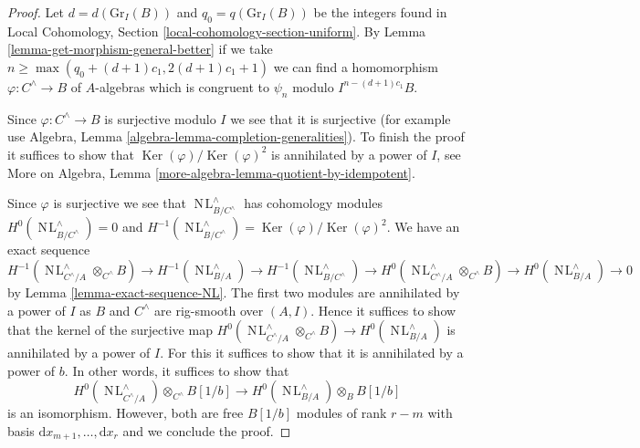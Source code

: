 \documentclass[10pt,a4paper]{amsart}
\theoremstyle{plain}
\theoremstyle{definition}
\theoremstyle{remark}
\numberwithin{equation}{subsection}
\def\NL{\mathop{N\!L}\nolimits}
\def\Ker{\mathop{\mathrm{Ker}}}
\begin{document}
\begin{proof}
\medskip\noindent
Let $d = d(\text{Gr}_I(B))$ and $q_0 = q(\text{Gr}_I(B))$ be the integers
found in 
Local Cohomology, Section \ref{local-cohomology-section-uniform}.
By Lemma \ref{lemma-get-morphism-general-better} if we take
$n \geq \max(q_0 + (d + 1)c_1, 2(d + 1)c_1 + 1)$ we can find a homomorphism
$\varphi : C^\wedge \to B$ of $A$-algebras which is congruent to
$\psi_n$ modulo $I^{n - (d + 1)c_1}B$.

\medskip\noindent
Since $\varphi : C^\wedge \to B$ is surjective modulo $I$
we see that it is surjective (for example use
Algebra, Lemma \ref{algebra-lemma-completion-generalities}).
To finish the proof it suffices to show that
$\Ker(\varphi)/\Ker(\varphi)^2$ is annihilated by a power of $I$, see
More on Algebra, Lemma \ref{more-algebra-lemma-quotient-by-idempotent}.

\medskip\noindent
Since $\varphi$ is surjective we see that
$\NL_{B/C^{\wedge}}^\wedge$ has cohomology modules
$H^0(\NL_{B/C^{\wedge}}^\wedge) = 0$ and
$H^{-1}(\NL_{B/C^{\wedge}}^\wedge) = \Ker(\varphi)/\Ker(\varphi)^2$.
We have an exact sequence
$$
H^{-1}(\NL_{C^\wedge/A}^\wedge \otimes_{C^\wedge} B) \to
H^{-1}(\NL_{B/A}^\wedge) \to
H^{-1}(\NL_{B/C^{\wedge}}^\wedge) \to
H^0(\NL_{C^\wedge/A}^\wedge \otimes_{C^\wedge} B) \to
H^0(\NL_{B/A}^\wedge) \to 0
$$
by Lemma \ref{lemma-exact-sequence-NL}. The first two modules are
annihilated by a power of $I$ as $B$ and $C^\wedge$ are rig-smooth over
$(A, I)$. Hence it suffices
to show that the kernel of the surjective map
$H^0(\NL_{C^\wedge/A}^\wedge \otimes_{C^\wedge} B) \to
H^0(\NL_{B/A}^\wedge)$ is annihilated by a power of $I$.
For this it suffices to show that it is annihilated by
a power of $b$. In other words, it suffices to show that
$$
H^0(\NL_{C^\wedge/A}^\wedge) \otimes_{C^\wedge} B[1/b]
\longrightarrow
H^0(\NL_{B/A}^\wedge) \otimes_B B[1/b]
$$
is an isomorphism. However, both are free $B[1/b]$ modules
of rank $r - m$ with basis $\text{d}x_{m + 1}, \ldots, \text{d}x_r$
and we conclude the proof.
\end{proof}
\end{document}
